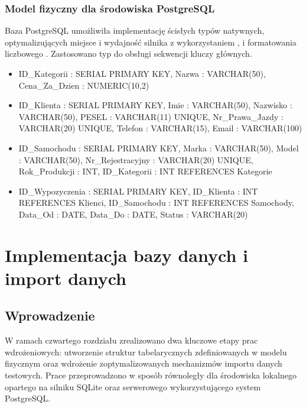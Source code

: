 \documentclass[a4paper,11pt,english,openany,oneside]{sphinxmanual}
\begin{document}
\subsection{Model fizyczny dla środowiska PostgreSQL}
\label{\detokenize{rozdzial_3/index:model-fizyczny-dla-srodowiska-postgresql}}
\sphinxAtStartPar
Baza PostgreSQL umożliwiła implementację ścisłych typów natywnych, optymalizujących miejsce i wydajność silnika z wykorzystaniem ,  i formatowania liczbowego . Zastosowano typ  do obsługi sekwencji kluczy głównych.
\begin{itemize}
\item {} 
\sphinxAtStartPar
{} ID\_Kategorii : SERIAL PRIMARY KEY, Nazwa : VARCHAR(50), Cena\_Za\_Dzien : NUMERIC(10,2)

\item {} 
\sphinxAtStartPar
{} ID\_Klienta : SERIAL PRIMARY KEY, Imie : VARCHAR(50), Nazwisko : VARCHAR(50), PESEL : VARCHAR(11) UNIQUE, Nr\_Prawa\_Jazdy : VARCHAR(20) UNIQUE, Telefon : VARCHAR(15), Email : VARCHAR(100)

\item {} 
\sphinxAtStartPar
{} ID\_Samochodu : SERIAL PRIMARY KEY, Marka : VARCHAR(50), Model : VARCHAR(50), Nr\_Rejestracyjny : VARCHAR(20) UNIQUE, Rok\_Produkcji : INT, ID\_Kategorii : INT REFERENCES Kategorie

\item {} 
\sphinxAtStartPar
{} ID\_Wypozyczenia : SERIAL PRIMARY KEY, ID\_Klienta : INT REFERENCES Klienci, ID\_Samochodu : INT REFERENCES Samochody, Data\_Od : DATE, Data\_Do : DATE, Status : VARCHAR(20)

\end{itemize}

\sphinxstepscope


\chapter{Implementacja bazy danych i import danych}
\label{\detokenize{rozdzial_4/index:implementacja-bazy-danych-i-import-danych}}\label{\detokenize{rozdzial_4/index::doc}}

\section{Wprowadzenie}
\label{\detokenize{rozdzial_4/index:wprowadzenie}}
\sphinxAtStartPar
W ramach czwartego rozdziału zrealizowano dwa kluczowe etapy prac wdrożeniowych: utworzenie struktur tabelarycznych zdefiniowanych w modelu fizycznym oraz wdrożenie zoptymalizowanych mechanizmów importu danych testowych. Prace przeprowadzono w sposób równoległy dla środowiska lokalnego opartego na silniku SQLite oraz serwerowego wykorzystującego system PostgreSQL.
\end{document}
